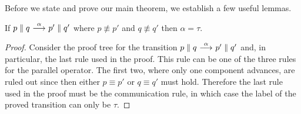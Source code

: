 Before we state and prove our main theorem, we establish a few useful lemmas.

\begin{lemma}\label{lemma:both_step_means_tau}
    If $p\parallel q \ {\stackrel{{\alpha}}{\longrightarrow}}\  p'\parallel q'$ where $p\not\equiv p'$ and
    $q\not\equiv q'$ then $\alpha = \tau$.
\end{lemma}
\begin{proof}
    Consider the proof tree for the transition $p\parallel q \ {\stackrel{{\alpha}}{\longrightarrow}}\ 
    p'\parallel q'$ and, in particular, the last rule used in the proof. This
    rule can be one of the three rules for the parallel operator. The first two,
    where only one component advances, are ruled out since then either $p\equiv p'$
    or $q\equiv q'$ must hold. Therefore the last rule used in the proof
    must be the communication rule, in which case the
    label of the proved transition can only be $\tau$.
\end{proof}

